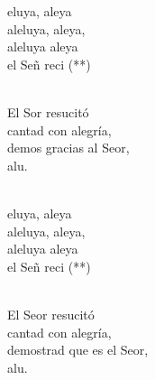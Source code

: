 \begin{cancion}%
	\begin{chorus}%
	eluya, aleya\\
	aleluya, aleya,\\
	aleluya aleya\\
	el Señ reci (**)  \\
	\end{chorus}%
	\jump\\
	El Sor resucitó \\
cantad con alegría,\\
	demos gracias al Seor,\\
	alu.\\\jump\\
	\begin{chorus}%
	eluya, aleya\\
	aleluya, aleya,\\
	aleluya aleya\\
	el Señ reci (**)  \\
	\end{chorus}%
	\jump\\
	El Seor resucitó\\
cantad con alegría,\\
	demostrad que es el Seor,\\
	alu.\\
\end{cancion}%
